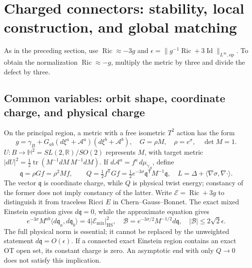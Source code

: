 \documentclass[a4paper,11pt]{article}
\numberwithin{equation}{section}
\theoremstyle{definition}
\newcommand{\Ric}{\operatorname{Ric}}
\newcommand{\tr}{\operatorname{tr}}
\newcommand{\Id}{\operatorname{Id}}
\newcommand{\op}{\mathrm{op}}
\newcommand{\R}{\mathbb R}
\begin{document}
\section{Charged connectors: stability, local construction, and global matching}
As in the preceding section, use $\Ric\approx-3g$ and
$\epsilon=\|g^{-1}\Ric+3\Id\|_{L^\infty,\op}$.
To obtain the normalization $\Ric\approx-g$, multiply the metric by three and divide the defect by three.

\subsection{Common variables: orbit shape, coordinate charge, and physical charge}
On the principal region, a metric with a free isometric $T^2$ action has the form
\[
 g=\gamma_B+G_{ab}(d\xi^a+\mathcal A^a)(d\xi^b+\mathcal A^b),
 \quad G=\rho M,\quad\rho=e^\sigma,\quad\det M=1.
\]
$U:B\to\mathbb H^2=SL(2,\R)/SO(2)$ represents $M$, with target metric
$|dU|^2=\tfrac12\tr(M^{-1}dM\,M^{-1}dM)$.
If $d\mathcal A^a=f^a\,d\mu_{\gamma_B}$, define
\begin{equation}\label{eq:charged-dictionary}
 \mathfrak q=\rho Gf=\rho^2Mf,\qquad
 Q=\tfrac12 f^{\mathsf T}Gf
   =\tfrac12 e^{-3\sigma}\mathfrak q^{\mathsf T}M^{-1}\mathfrak q,
 \quad L=\Delta+\langle\nabla\sigma,\nabla\cdot\rangle.
\end{equation}
The vector $\mathfrak q$ is coordinate charge, while $Q$ is physical twist energy; constancy of the former does not imply constancy of the latter.
Write $\mathcal E=\Ric+3g$ to distinguish it from traceless Ricci $E$ in Chern--Gauss--Bonnet.
The exact mixed Einstein equation gives $d\mathfrak q=0$, while the approximate equation gives
\begin{equation}\label{eq:physical-charge-source}
 e^{-3\sigma}M^{ab}\langle d\mathfrak q_a,d\mathfrak q_b\rangle
 =4|\mathcal E_{\mathrm{mix}}|_{\mathrm{HS}}^2,
 \quad
 \mathscr B=e^{-3\sigma/2}M^{-1/2}d\mathfrak q,
 \quad |\mathscr B|\le2\sqrt2\epsilon.
\end{equation}
The full physical norm is essential; it cannot be replaced by the unweighted statement $d\mathfrak q=O(\epsilon)$.
If a connected exact Einstein region contains an exact OT open set, its constant charge is zero.
An asymptotic end with only $Q\to0$ does not satisfy this implication.
\end{document}
